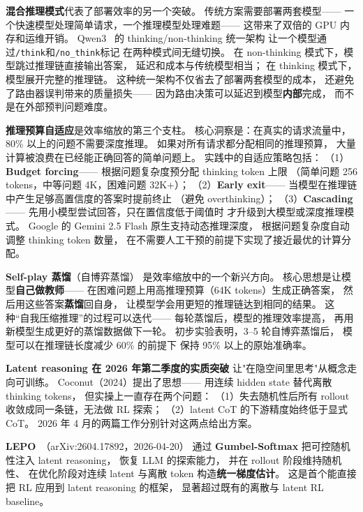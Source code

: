 \textbf{混合推理模式}代表了部署效率的另一个突破。
传统方案需要部署两套模型——
一个快速模型处理简单请求，一个推理模型处理难题——
这带来了双倍的 GPU 内存和运维开销。
Qwen3~\cite{qwen2025qwen3} 的 thinking/non-thinking 统一架构
让一个模型通过\texttt{/think}和\texttt{/no\_think}标记
在两种模式间无缝切换。
在 non-thinking 模式下，模型跳过推理链直接输出答案，
延迟和成本与传统模型相当；
在 thinking 模式下，模型展开完整的推理链。
这种统一架构不仅省去了部署两套模型的成本，
还避免了路由器误判带来的质量损失——
因为路由决策可以延迟到模型\textbf{内部}完成，
而不是在外部预判问题难度。

\textbf{推理预算自适应}是效率缩放的第三个支柱。
核心洞察是：在真实的请求流量中，
80\% 以上的问题不需要深度推理。
如果对所有请求都分配相同的推理预算，
大量计算被浪费在已经能正确回答的简单问题上。
实践中的自适应策略包括：
（1）\textbf{Budget forcing}——
根据问题复杂度预分配 thinking token 上限
（简单问题 256 tokens，中等问题 4K，困难问题 32K+）；
（2）\textbf{Early exit}——
当模型在推理链中产生足够高置信度的答案时提前终止
（避免 overthinking）；
（3）\textbf{Cascading}——
先用小模型尝试回答，只在置信度低于阈值时
才升级到大模型或深度推理模式。
Google 的 Gemini 2.5 Flash 原生支持动态推理深度，
根据问题复杂度自动调整 thinking token 数量，
在不需要人工干预的前提下实现了接近最优的计算分配。

\textbf{Self-play 蒸馏}（自博弈蒸馏）
是效率缩放中的一个新兴方向。
核心思想是让模型\textbf{自己做教师}——
在困难问题上用高推理预算（64K tokens）生成正确答案，
然后用这些答案\textbf{蒸馏}回自身，
让模型学会用更短的推理链达到相同的结果。
这种“自我压缩推理”的过程可以迭代——
每轮蒸馏后，模型的推理效率提高，
再用新模型生成更好的蒸馏数据做下一轮。
初步实验表明，3--5 轮自博弈蒸馏后，
模型可以在推理链长度减少 60\% 的前提下
保持 95\% 以上的原始准确率。

\textbf{Latent reasoning 在 2026 年第二季度的实质突破}
让"在隐空间里思考"从概念走向可训练。
Coconut（2024）提出了思想——
用连续 hidden state 替代离散 thinking tokens，
但实操上一直存在两个问题：
（1）失去随机性后所有 rollout 收敛成同一条链，无法做 RL 探索；
（2）latent CoT 的下游精度始终低于显式 CoT。
2026 年 4 月的两篇工作分别针对这两点给出方案。

\textbf{LEPO}~\cite{lepo2026}（arXiv:2604.17892，2026-04-20）
通过 \textbf{Gumbel-Softmax} 把可控随机性注入 latent reasoning，
恢复 LLM 的探索能力，
并在 rollout 阶段维持随机性、
在优化阶段对连续 latent 与离散 token 构造\textbf{统一梯度估计}。
这是首个能直接把 RL 应用到 latent reasoning 的框架，
显著超过既有的离散与 latent RL baseline。


